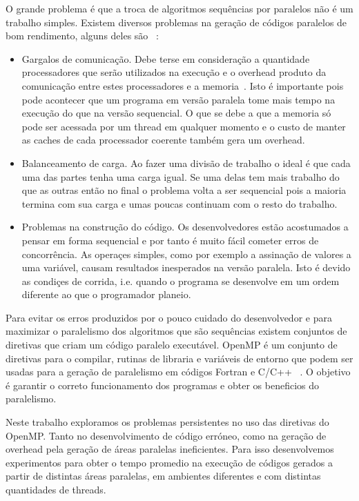 \documentclass[12pt,fleqn]{article}
\begin{document}
O grande problema é que a troca de algoritmos sequências por paralelos não é um trabalho simples. Existem diversos problemas na geração de códigos paralelos de bom rendimento, alguns deles são ~\cite{Matloff14}: 
\begin{itemize} 
\item Gargalos de comunicação. Debe ter­se em consideração a quantidade processadores que serão utilizados na execução e o overhead produto da comunicação entre estes processadores e a memoria~\cite{Gebali11}. Isto é importante pois pode acontecer que um programa em versão paralela tome mais tempo na execução do que na versão sequencial. O que se debe a que a memoria só pode ser acessada por um thread em qualquer momento e o custo de manter as caches de cada processador coerente também gera um overhead. 
\item Balanceamento de carga. Ao fazer uma divisão de trabalho o ideal é que cada uma das partes tenha uma carga igual. Se uma delas tem mais trabalho do que as outras então no final o problema volta a ser sequencial pois a maioria termina com sua carga e umas poucas continuam com o resto do trabalho. 
\item Problemas na construção do código. Os desenvolvedores estão acostumados a pensar em forma sequencial e por tanto é muito fácil cometer erros de 
concorrência. As operaçes simples, como por exemplo a assinação de valores a uma variável, causam resultados inesperados na versão paralela. Isto é devido as condiçes de corrida, i.e. quando o programa se desenvolve em um ordem diferente ao que o programador planeio. 
\end{itemize} 
 Para evitar os erros produzidos por o pouco cuidado do desenvolvedor e para maximizar o paralelismo dos algoritmos que são sequências existem conjuntos de diretivas que criam um código paralelo executável. OpenMP é um conjunto de diretivas para o compilar, rutinas de libraria e variáveis de entorno que podem ser usadas para a geração de paralelismo em códigos Fortran e C/C++ ~\cite{OpenMP13}. O objetivo é garantir o correto funcionamento dos programas e obter os beneficios do paralelismo. 
 
Neste trabalho exploramos os problemas persistentes no uso das diretivas do OpenMP. Tanto no desenvolvimento de código erróneo, como na geração de overhead pela geração de áreas paralelas ineficientes. Para isso desenvolvemos experimentos para obter o tempo promedio na execução de códigos gerados a partir de distintas áreas paralelas, em ambientes diferentes e com distintas quantidades de threads.  
 
\end{document}
